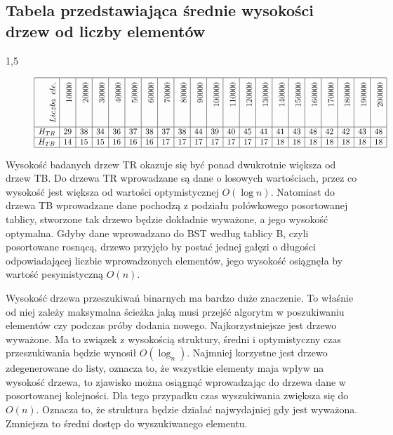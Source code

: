 \documentclass[polish,polish,a4paper]{article}
\begin{document}
\subsection*{Tabela przedstawiająca średnie wysokości drzew od liczby elementów}
\begin{spacing}{1,5}
\begin{figure}[H]

	\centering
	\begin{equation*}
	\begin{array}{|r|r|r|r|r|r|r|r|r|r|r|r|r|r|r|r|r|r|r|r|r|}
	\hline
\rotatebox[origin=r]{90}{$ \enskip Liczba\enskip ele.$}&\rotatebox[origin=r]{90}{10000}&\rotatebox[origin=r]{90}{20000}&\rotatebox[origin=r]{90}{30000}&\rotatebox[origin=r]{90}{40000}&\rotatebox[origin=r]{90}{50000}&\rotatebox[origin=r]{90}{60000}&\rotatebox[origin=r]{90}{70000}&\rotatebox[origin=r]{90}{80000}&\rotatebox[origin=r]{90}{90000}&\rotatebox[origin=r]{90}{100000}&\rotatebox[origin=r]{90}{110000}&\rotatebox[origin=r]{90}{120000}&\rotatebox[origin=r]{90}{130000}&\rotatebox[origin=r]{90}{140000}&\rotatebox[origin=r]{90}{150000}&\rotatebox[origin=r]{90}{160000}&\rotatebox[origin=r]{90}{170000}&\rotatebox[origin=r]{90}{180000}&\rotatebox[origin=r]{90}{190000}&\rotatebox[origin=r]{90}{200000}\\\hline
H_{TR}&29&38&34&36&37&38&37&38&44&39&40&45&41&41&43&48&42&42&43&48\\\hline
H_{TB}&14&15&15&16&16&16&17&17&17&17&17&17&17&18&18&18&18&18&18&18\\\hline



	\end{array}
	\end{equation*}
\end{figure}
\end{spacing}

Wysokość badanych drzew TR okazuje się być ponad dwukrotnie większa od drzew TB. Do drzewa TR wprowadzane są dane o losowych wartościach, przez co wysokość jest większa od wartości optymistycznej $O(\log{n})$. Natomiast do drzewa TB wprowadzane dane pochodzą z podziału połówkowego posortowanej tablicy, stworzone tak drzewo będzie dokładnie wyważone, a jego wysokość optymalna.
Gdyby dane wprowadzano do BST według tablicy B, czyli posortowane rosnącą, drzewo przyjęło by postać jednej gałęzi o długości odpowiadającej liczbie wprowadzonych elementów, jego wysokość osiągnęła by wartość pesymistyczną $ O(n) $.

Wysokość drzewa przeszukiwań binarnych ma bardzo duże znaczenie. To właśnie od niej zależy maksymalna ścieżka jaką musi przejść algorytm w poszukiwaniu elementów czy  podczas próby dodania nowego. 
Najkorzystniejsze jest drzewo wyważone. Ma to związek z wysokością struktury, średni i optymistyczny czas przeszukiwania będzie wynosił $O(\log_{n})$. Najmniej korzystne jest drzewo zdegenerowane do listy, oznacza to, że wszystkie elementy maja wpływ na wysokość drzewa, to zjawisko można osiągnąć wprowadzając do drzewa dane w posortowanej kolejności. Dla tego przypadku czas wyszukiwania zwiększa się do $ O(n) $. Oznacza to, że struktura będzie działać najwydajniej gdy jest wyważona. Zmniejsza to średni dostęp do wyszukiwanego elementu.
\end{document}
